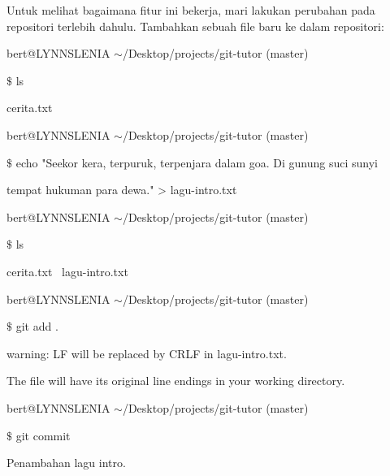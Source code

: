 \hspace*{0.50in} Untuk melihat bagaimana fitur ini bekerja, mari lakukan perubahan pada repositori terlebih dahulu. Tambahkan sebuah file baru ke dalam repositori: \par
\noindent 
{\fontsize{10pt}{10pt}\selectfont bert@LYNNSLENIA  $  \sim  $/Desktop/projects/git-tutor (master)} \par
\noindent 
{\fontsize{10pt}{10pt}\selectfont  $  \$  $ ls} \par
\noindent 
{\fontsize{10pt}{10pt}\selectfont cerita.txt} \par
\noindent 
\vspace{10pt}
\noindent 
{\fontsize{10pt}{10pt}\selectfont bert@LYNNSLENIA  $  \sim  $/Desktop/projects/git-tutor (master)} \par
\noindent 
{\fontsize{10pt}{10pt}\selectfont  $  \$  $ echo "Seekor kera, terpuruk, terpenjara dalam goa. Di gunung suci sunyi} \par
\noindent 
{\fontsize{10pt}{10pt}\selectfont tempat hukuman para dewa." > lagu-intro.txt} \par
\noindent 
\vspace{10pt}
\noindent 
{\fontsize{10pt}{10pt}\selectfont bert@LYNNSLENIA  $  \sim  $/Desktop/projects/git-tutor (master)} \par
\noindent 
{\fontsize{10pt}{10pt}\selectfont  $  \$  $ ls} \par
\noindent 
{\fontsize{10pt}{10pt}\selectfont cerita.txt~ lagu-intro.txt} \par
\noindent 
\vspace{10pt}
\noindent 
{\fontsize{10pt}{10pt}\selectfont bert@LYNNSLENIA  $  \sim  $/Desktop/projects/git-tutor (master)} \par
\noindent 
{\fontsize{10pt}{10pt}\selectfont  $  \$  $ git add .} \par
\noindent 
{\fontsize{10pt}{10pt}\selectfont warning: LF will be replaced by CRLF in lagu-intro.txt.} \par
\noindent 
{\fontsize{10pt}{10pt}\selectfont The file will have its original line endings in your working directory.} \par
\noindent 
\vspace{10pt}
\noindent 
{\fontsize{10pt}{10pt}\selectfont bert@LYNNSLENIA  $  \sim  $/Desktop/projects/git-tutor (master)} \par
\noindent 
{\fontsize{10pt}{10pt}\selectfont  $  \$  $ git commit} \par
\noindent 
{\fontsize{10pt}{10pt}\selectfont [master 03d0628] Penambahan lagu intro.} \par
